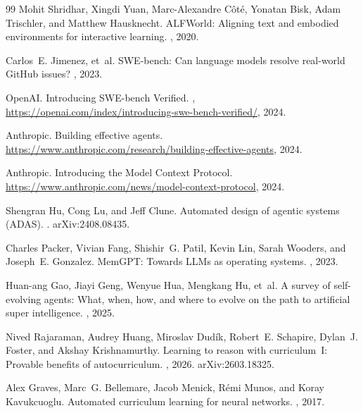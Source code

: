 \documentclass[11pt,a4paper]{article}
\begin{document}
\begin{thebibliography}{99}
Mohit Shridhar, Xingdi Yuan, Marc-Alexandre Côté, Yonatan Bisk, Adam Trischler, and Matthew Hausknecht.
\newblock ALFWorld: Aligning text and embodied environments for interactive learning.
, 2020.

Carlos~E. Jimenez, et~al.
\newblock SWE-bench: Can language models resolve real-world GitHub issues?
, 2023.

OpenAI.
\newblock Introducing SWE-bench Verified.
, \url{https://openai.com/index/introducing-swe-bench-verified/}, 2024.

Anthropic.
\newblock Building effective agents.
\newblock \url{https://www.anthropic.com/research/building-effective-agents}, 2024.

Anthropic.
\newblock Introducing the Model Context Protocol.
\newblock \url{https://www.anthropic.com/news/model-context-protocol}, 2024.

Shengran Hu, Cong Lu, and Jeff Clune.
\newblock Automated design of agentic systems (ADAS).
. arXiv:2408.08435.

Charles Packer, Vivian Fang, Shishir~G. Patil, Kevin Lin, Sarah Wooders, and Joseph~E. Gonzalez.
\newblock MemGPT: Towards LLMs as operating systems.
, 2023.

Huan-ang Gao, Jiayi Geng, Wenyue Hua, Mengkang Hu, et~al.
\newblock A survey of self-evolving agents: What, when, how, and where to evolve on the path to artificial super intelligence.
, 2025.

Nived Rajaraman, Audrey Huang, Miroslav Dudík, Robert~E. Schapire, Dylan~J. Foster, and Akshay Krishnamurthy.
\newblock Learning to reason with curriculum~I: Provable benefits of autocurriculum.
, 2026. arXiv:2603.18325.

Alex Graves, Marc~G. Bellemare, Jacob Menick, Rémi Munos, and Koray Kavukcuoglu.
\newblock Automated curriculum learning for neural networks.
, 2017.


\end{thebibliography}
\end{document}
